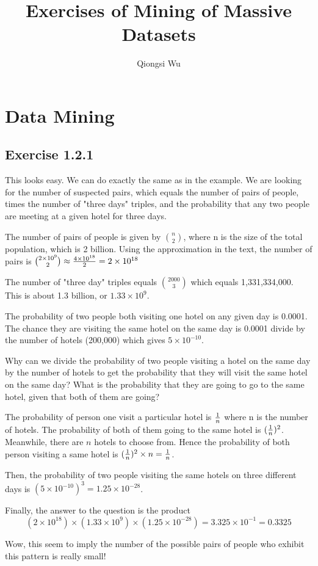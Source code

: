\documentclass{article}
\begin{document}
\title{Exercises of Mining of Massive Datasets}
\author{Qiongsi Wu}
\maketitle
\section{Data Mining}
\subsection{Exercise 1.2.1}
This looks easy. We can do exactly the same as in the example. We are looking for the number of suspected pairs, which equals the number of pairs of people, times the number of "three days" triples, and the probability that any two people are meeting at a given hotel for three days. 

The number of pairs of people is given by ${n \choose 2}$, where n is the size of the total population, which is 2 billion. Using the approximation in the text, the number of pairs is
${2\times10^{9} \choose 2} \approx {{4\times10^{18}}\over2} = 2\times10^{18}$

The number of "three day" triples equals ${2000 \choose 3}$ which equals 1,331,334,000. This is about 1.3 billion, or $1.33\times10^9$. 

The probability of two people both visiting one hotel on any given day is 0.0001. The chance they are visiting the same hotel on the same day is 0.0001 divide by the number of hotels (200,000) which gives $5\times10^{-10}$. 

Why can we  divide the probability of two people visiting a hotel on the same day by the number of hotels to get the probability that they will visit the same hotel on the same day?  What is the probability that they are going to go to the same hotel, given that both of them are going? 

The probability of person one visit a particular hotel is $1\over n$ where n is the number of hotels. The probability of both of them going to the same hotel is $({1\over n})^2$. Meanwhile, there are $n$ hotels to choose from. Hence the probability of both person visiting a same hotel is $({1\over n})^2\times n = {1\over n}$.

Then, the probability of two people visiting the same hotels on three different days is $({5\times10^{-10}})^3 = 1.25\times10^{-28}$.  

Finally, the answer to the question is the product
\[({2\times10^{18}})\times({1.33\times10^9})\times({1.25\times10^{-28}}) = 3.325\times10^{-1} = 0.3325\]

Wow, this seem to imply the number of the possible pairs of people who exhibit this pattern is really small! 
\end{document}

